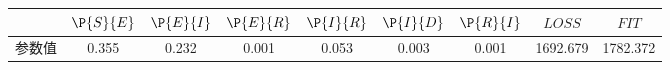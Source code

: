 \begin{tabular}{ccccccccc}
\hline
&$\P{S}{E}$&$\P{E}{I}$&$\P{E}{R}$&$\P{I}{R}$&$\P{I}{D}$&$\P{R}{I}$&$LOSS$&$FIT$\\
\hline
参数值&0.355&0.232&0.001&0.053&0.003&0.001&1692.679&1782.372\\
\hline
\end{tabular}
